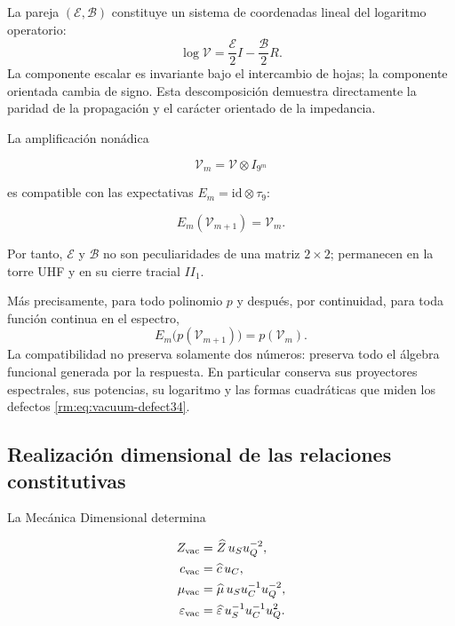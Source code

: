 La pareja \((\mathcal E,\mathcal B)\) constituye un sistema de coordenadas lineal del logaritmo
operatorio:
\begin{equation}
\log\mathcal V
=\frac{\mathcal E}{2}I-\frac{\mathcal B}{2}R.
\label{rm:eq:vacuum-log-decomposition}
\end{equation}
La componente escalar es invariante bajo el intercambio de hojas; la
componente orientada cambia de signo. Esta descomposici\'on demuestra
directamente la paridad de la propagaci\'on y el car\'acter orientado de la
impedancia.

La amplificaci\'on non\'adica

\[
\mathcal V_m=\mathcal V\otimes I_{9^m}
\]

es compatible con las expectativas \(E_m=\mathrm{id}\otimes\tau_9\):

\[
E_m(\mathcal V_{m+1})=\mathcal V_m.
\]

Por tanto, \(\mathcal E\) y \(\mathcal B\) no son peculiaridades de una matriz \(2\times2\); permanecen en la torre UHF y en su cierre tracial \(II_1\).

M\'as precisamente, para todo polinomio \(p\) y despu\'es, por continuidad,
para toda funci\'on continua en el espectro,
\begin{equation}
E_m\bigl(p(\mathcal V_{m+1})\bigr)=p(\mathcal V_m).
\label{rm:eq:vacuum-functional-refinement}
\end{equation}
La compatibilidad no preserva solamente dos n\'umeros: preserva todo el
\'algebra funcional generada por la respuesta. En particular conserva sus
proyectores espectrales, sus potencias, su logaritmo y las formas cuadr\'aticas
que miden los defectos \cref{rm:eq:vacuum-defect34}.

\subsection{Realizaci\'on dimensional de las relaciones constitutivas}

La Mec\'anica Dimensional determina

\begin{align}
Z_{\rm vac}&=\widehat Z\,u_Su_Q^{-2},\\
c_{\rm vac}&=\widehat c\,u_C,\\
\mu_{\rm vac}&=\widehat\mu\,u_Su_C^{-1}u_Q^{-2},\\
\varepsilon_{\rm vac}&=\widehat\varepsilon\,u_S^{-1}u_C^{-1}u_Q^2.
\label{rm:eq:vacuum-sections}
\end{align}

